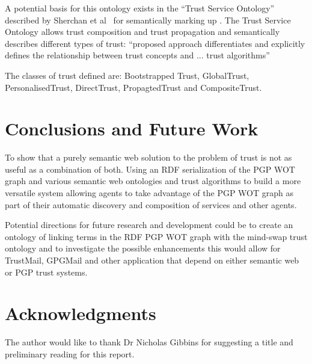 \documentclass{acm_proc_article-sp}
\begin{document}
A potential basis for this ontology exists in the ``Trust Service Ontology'' described  by Sherchan et al~\cite{sherchan_trust_2010} for semantically marking up . The Trust Service Ontology  allows trust composition and trust propagation and semantically describes different types of trust: ``proposed approach differentiates  and explicitly
defines the relationship between trust concepts and ... trust algorithms''

The  classes of trust defined are: Bootstrapped Trust, GlobalTrust,  PersonalisedTrust, DirectTrust, PropagtedTrust and CompositeTrust.

\section{Conclusions and Future Work}

To show that a purely semantic web solution to the problem of trust is not as useful as a combination of both.  Using an RDF serialization of the PGP WOT graph and various semantic web ontologies and trust algorithms to build a more versatile system allowing agents to take advantage of the PGP WOT graph as part of their automatic discovery and composition of services and other agents.

Potential directions for future research and development could be to create an ontology of linking terms in the RDF PGP WOT graph with the mind-swap trust ontology\cite{jennifer_golbeck_trust_2013} and to investigate the possible enhancements this would allow for TrustMail, GPGMail and other application that depend on either semantic web or PGP trust systems.

\section{Acknowledgments}
The author would like to thank Dr Nicholas Gibbins for suggesting a title and preliminary reading for this report.

%


%
%
\end{document}
